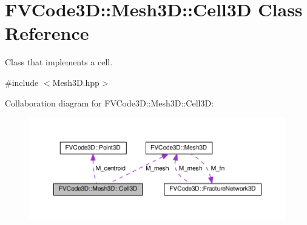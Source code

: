 \hypertarget{classFVCode3D_1_1Mesh3D_1_1Cell3D}{}\section{F\+V\+Code3D\+:\+:Mesh3D\+:\+:Cell3D Class Reference}
\label{classFVCode3D_1_1Mesh3D_1_1Cell3D}


Class that implements a cell.  




{\ttfamily \#include $<$Mesh3\+D.\+hpp$>$}



Collaboration diagram for F\+V\+Code3D\+:\+:Mesh3D\+:\+:Cell3D\+:
\nopagebreak
\begin{figure}[H]
\begin{center}
\leavevmode
\includegraphics[width=350pt]{classFVCode3D_1_1Mesh3D_1_1Cell3D__coll__graph}
\end{center}
\end{figure}

